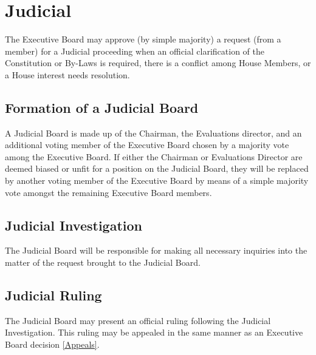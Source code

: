 \documentclass{article}
\newcommand{\article}[1]{\section{#1} \label{#1}}
\newcommand{\asection}[1]{\subsection{#1} \label{#1}}
\begin{document}
\article{Judicial}
The Executive Board may approve (by simple majority) a request (from a member) for a Judicial proceeding when an official clarification of the Constitution or By-Laws is required, there is a conflict among House Members, or a House interest needs resolution.
\asection{Formation of a Judicial Board}
A Judicial Board is made up of the Chairman, the Evaluations director, and an additional voting member of the Executive Board chosen by a majority vote among the Executive Board.
If either the Chairman or Evaluations Director are deemed biased or unfit for a position on the Judicial Board,  they will be replaced by another voting member of the Executive Board by means of a simple majority vote amongst the remaining Executive Board members.
\asection{Judicial Investigation}
The Judicial Board will be responsible for making all necessary inquiries into the matter of the request brought to the Judicial Board.
\asection{Judicial Ruling}
The Judicial Board may present an official ruling following the Judicial Investigation.
This ruling may be appealed in the same manner as an Executive Board decision \ref{Appeals}.
\end{document}
